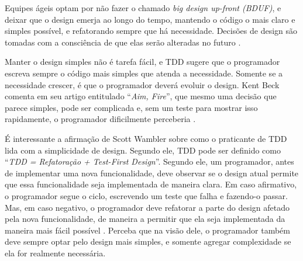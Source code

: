 Equipes ágeis optam por não fazer o chamado \textit{big design up-front (BDUF)},
e deixar que o design emerja ao longo do tempo, mantendo o código o mais claro e
simples possível, e refatorando sempre que há necessidade. Decisões de
design são tomadas com a consciência de que elas serão alteradas no futuro
\cite{is-design-dead}.

Manter o design simples não é tarefa fácil, e TDD sugere que o programador
escreva sempre o código mais simples que atenda a necessidade. Somente se a
necessidade crescer, é que o programador deverá evoluir o design. Kent Beck
comenta em seu artigo entitulado ``\textit{Aim, Fire}'', que mesmo uma decisão que
parece simples, pode ser complicada e, sem um teste para mostrar isso rapidamente, o
programador dificilmente perceberia \cite{aim-fire}. 

É interessante a afirmação de Scott Wambler sobre como o praticante de TDD lida
com a simplicidade de design. Segundo ele, TDD pode ser definido como
``\textit{TDD = Refatoração + Test-First Design}''. Segundo ele, um programador,
antes de implementar uma nova funcionalidade, deve observar se o design atual
permite que essa funcionalidade seja implementada de maneira clara. Em caso
afirmativo, o programador segue o ciclo, escrevendo um teste que falha e
fazendo-o passar. Mas, em caso negativo, o programador deve refatorar a parte do
design afetado pela nova funcionalidade, de maneira a permitir que ela seja
implementada da maneira mais fácil possível \cite{wambler-tdd}. Perceba que na
visão dele, o programador também deve sempre optar pelo design mais simples, e
somente agregar complexidade se ela for realmente necessária.
